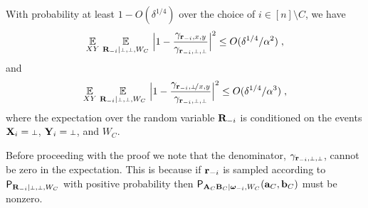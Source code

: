\begin{lemma}\label{lem:norms-are-close}
With probability at least $1 - O(\delta^{1/4})$ over the choice of $i \in [n] \setminus C$, we have
	\begin{equation}
	\label{eq:norms-are-close-s0}
		\Ex_{XY} \, \Ex_{\bR_\mi | \dummy, \dummy, W_C} \, \Big | 1 - \frac{\gamma_{\br_\mi, x,y}}{\gamma_{\br_\mi,\dummy,\dummy}} \Big |^2 \leq O(\delta^{1/4}/\alpha^2)\;,
	\end{equation}
	and
	\begin{equation}
	\label{eq:norms-are-close-s1}
		\Ex_{XY} \, \Ex_{\bR_\mi | \dummy, \dummy, W_C} \, \Big | 1 - \frac{\gamma_\sspxy}{\gamma_{\br_\mi,\dummy,\dummy}} \Big |^2 \leq O(\delta^{1/4}/\alpha^3)\;,
	\end{equation}
	where the expectation over the random variable $\mathbf{R}_{-i}$ is conditioned on the events $\bX_i = \dummy$, $\bY_i = \dummy$, and $W_C$. 
\end{lemma}
Before proceeding with the proof we note that the denominator, $\gamma_\sspp$, cannot be zero in the expectation. This is because if $\mathbf{r}_{-i}$ is sampled according to $\P_{\bR_\mi | \dummy, \dummy, W_C}$ with positive probability then $\mathsf{P}_{\mathbf{A}_C \mathbf{B}_C | {\boldsymbol{\omega}}_{-i}, W_C}(\mathbf{a}_C,\mathbf{b}_C)$ must be nonzero. 

